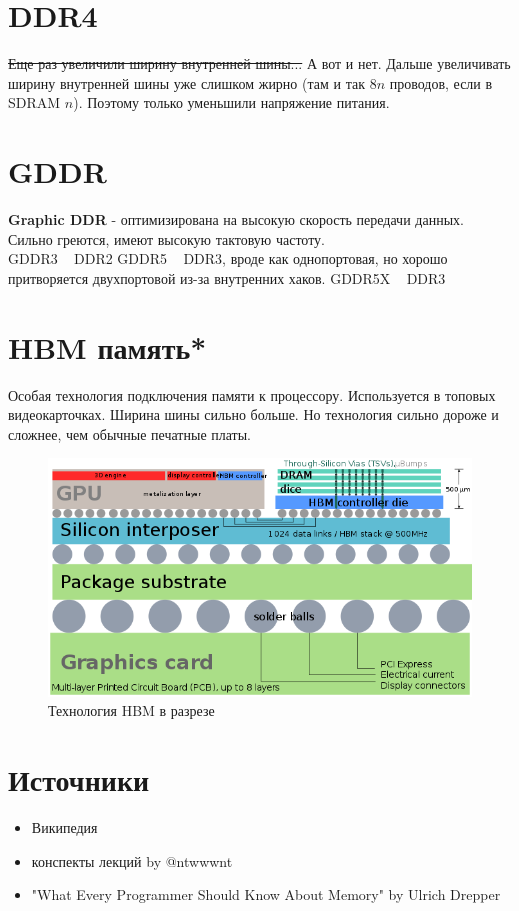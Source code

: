 \documentclass[12pt, a4paper]{article}
\begin{document}
\section{DDR4}
\sout{Еще раз увеличили ширину внутренней шины...} А вот и нет. Дальше увеличивать ширину внутренней шины уже слишком жирно (там и так $8n$ проводов, если в SDRAM $n$). Поэтому только уменьшили напряжение питания.\\
\section{GDDR}
\textbf{Graphic DDR} - оптимизирована на высокую скорость передачи данных. Сильно греются, имеют высокую тактовую частоту.\\
GDDR3 ~ DDR2
GDDR5 ~ DDR3, вроде как однопортовая, но хорошо притворяется двухпортовой из-за внутренних хаков.
GDDR5X ~ DDR3
\section{HBM память*}
Особая технология подключения памяти к процессору. Используется в топовых видеокарточках. Ширина шины сильно больше. Но технология сильно дороже и сложнее, чем обычные печатные платы.
\begin{figure}[h!]
    \centering
    \includegraphics[scale=0.4]{./images/HBM.png}
    \caption{Технология HBM в разрезе}
    \label{fig:HBM}
\end{figure}
\section{Источники}
\begin{itemize}
    \item Википедия
    \item конспекты лекций by @ntwwwnt
    \item "What Every Programmer Should Know About Memory" by Ulrich Drepper
\end{itemize}
\end{document}

